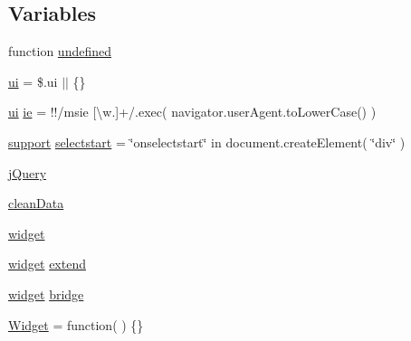 \subsection*{Variables}
\begin{DoxyCompactItemize}
\item 
function \hyperlink{jquery-ui_8js_a08113a236cc18d2a9d5ce27e638012be}{undefined}
\item 
\hyperlink{jquery-ui_8js_ac492f8de2d00b6c4282e766bfadaf2e7}{ui} = \$.ui $\vert$$\vert$ \{\}
\item 
\hyperlink{jquery-ui_8js_ac492f8de2d00b6c4282e766bfadaf2e7}{ui} \hyperlink{jquery-ui_8js_a7434fb8cf6da72f87b732a8a052232a3}{ie} = !!/msie \mbox{[}\textbackslash{}w.\mbox{]}+/.exec( navigator.\+user\+Agent.\+to\+Lower\+Case() )
\item 
\hyperlink{jquery_8mobile-1_83_81_8js_a9609bc27ca5c7f02203b330bb5dd0133}{support} \hyperlink{jquery-ui_8js_ad37f03bb64f02fb08935aeb5529075cb}{selectstart} = \char`\"{}onselectstart\char`\"{} in document.\+create\+Element( \char`\"{}div\char`\"{} )
\item 
\hyperlink{jquery-ui_8js_a1e853eabf9d8ee3ac2700c9a2ddda672}{j\+Query}
\item 
\hyperlink{jquery-ui_8js_a4d80c5737711144fedbc444c477b4ae1}{clean\+Data}
\item 
\hyperlink{jquery-ui_8js_a60d5947424f4fcd4ca9ed05e6dc43227}{widget}
\item 
\hyperlink{jquery_8mobile-1_83_81_8js_ac4a01edf7e49cc35291bb23e78a07acf}{widget} \hyperlink{jquery-ui_8js_abe357548e1025880076c7e839a3e5755}{extend}
\item 
\hyperlink{jquery_8mobile-1_83_81_8js_ac4a01edf7e49cc35291bb23e78a07acf}{widget} \hyperlink{jquery-ui_8js_a8b5680c375ebc550c53429eb461391ac}{bridge}
\item 
\hyperlink{jquery-ui_8js_afc4c2169b499b3ea4e8c3e0924a3df4f}{Widget} = function( ) \{\}
\item 
$$
\end{DoxyCompactItemize}
